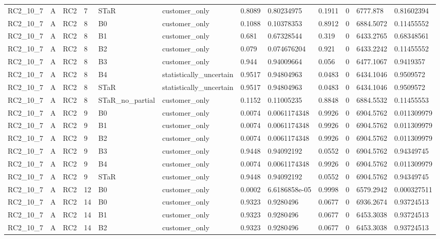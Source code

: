 \begin{longtable}{llllllllllll}
RC2\_10\_7 & A & RC2 & 7 & STaR & customer\_only & 0.8089 & 0.80234975 & 0.1911 & 0 & 6777.878 & 0.81602394 \\
RC2\_10\_7 & A & RC2 & 8 & B0 & customer\_only & 0.1088 & 0.10378353 & 0.8912 & 0 & 6884.5072 & 0.11455552 \\
RC2\_10\_7 & A & RC2 & 8 & B1 & customer\_only & 0.681 & 0.67328544 & 0.319 & 0 & 6433.2765 & 0.68348561 \\
RC2\_10\_7 & A & RC2 & 8 & B2 & customer\_only & 0.079 & 0.074676204 & 0.921 & 0 & 6433.2242 & 0.11455552 \\
RC2\_10\_7 & A & RC2 & 8 & B3 & customer\_only & 0.944 & 0.94009664 & 0.056 & 0 & 6477.1067 & 0.9419357 \\
RC2\_10\_7 & A & RC2 & 8 & B4 & statistically\_uncertain & 0.9517 & 0.94804963 & 0.0483 & 0 & 6434.1046 & 0.9509572 \\
RC2\_10\_7 & A & RC2 & 8 & STaR & statistically\_uncertain & 0.9517 & 0.94804963 & 0.0483 & 0 & 6434.1046 & 0.9509572 \\
RC2\_10\_7 & A & RC2 & 8 & STaR\_no\_partial & customer\_only & 0.1152 & 0.11005235 & 0.8848 & 0 & 6884.5532 & 0.11455553 \\
RC2\_10\_7 & A & RC2 & 9 & B0 & customer\_only & 0.0074 & 0.0061174348 & 0.9926 & 0 & 6904.5762 & 0.011309979 \\
RC2\_10\_7 & A & RC2 & 9 & B1 & customer\_only & 0.0074 & 0.0061174348 & 0.9926 & 0 & 6904.5762 & 0.011309979 \\
RC2\_10\_7 & A & RC2 & 9 & B2 & customer\_only & 0.0074 & 0.0061174348 & 0.9926 & 0 & 6904.5762 & 0.011309979 \\
RC2\_10\_7 & A & RC2 & 9 & B3 & customer\_only & 0.9448 & 0.94092192 & 0.0552 & 0 & 6904.5762 & 0.94349745 \\
RC2\_10\_7 & A & RC2 & 9 & B4 & customer\_only & 0.0074 & 0.0061174348 & 0.9926 & 0 & 6904.5762 & 0.011309979 \\
RC2\_10\_7 & A & RC2 & 9 & STaR & customer\_only & 0.9448 & 0.94092192 & 0.0552 & 0 & 6904.5762 & 0.94349745 \\
RC2\_10\_7 & A & RC2 & 12 & B0 & customer\_only & 0.0002 & 6.6186858e-05 & 0.9998 & 0 & 6579.2942 & 0.000327511 \\
RC2\_10\_7 & A & RC2 & 14 & B0 & customer\_only & 0.9323 & 0.9280496 & 0.0677 & 0 & 6936.2674 & 0.93724513 \\
RC2\_10\_7 & A & RC2 & 14 & B1 & customer\_only & 0.9323 & 0.9280496 & 0.0677 & 0 & 6453.3038 & 0.93724513 \\
RC2\_10\_7 & A & RC2 & 14 & B2 & customer\_only & 0.9323 & 0.9280496 & 0.0677 & 0 & 6453.3038 & 0.93724513 \\

\end{longtable}
